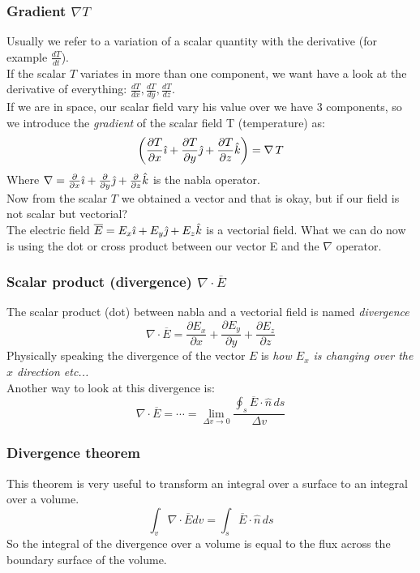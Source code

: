\subsubsection*{Gradient $\nabla T$}
Usually we refer to a variation of a scalar quantity with the derivative (for example $\frac{dT}{dt}$).\\
If the scalar $T$ variates in more than one component, we want have a look at the derivative of everything: $\frac{dT}{dx},\frac{dT}{dy},\frac{dT}{dz}$.\\
If we are in space, our scalar field vary his value over we have 3 components, so we introduce the \emph{gradient} of the scalar field T (temperature) as:
\begin{equation}
\left(\frac{\partial T}{\partial x}\hat{\imath}+\frac{\partial T}{\partial y}\hat{\jmath}+\frac{\partial T}{\partial z}\hat{\mathnormal{k}}\right)=\nabla\,T
\end{equation}
Where $\nabla=\frac{\partial}{\partial x}\hat{\imath} +\frac{\partial}{\partial y}\hat{\jmath} +\frac{\partial}{\partial z}\hat{\mathnormal{k}}$ is the nabla operator.\\
Now from the scalar $T$ we obtained a vector and that is okay, but if our field is not scalar but vectorial?\\
The electric field $\overline{E}=E_x \hat{\imath} + E_y \hat{\jmath} + E_z \hat{\mathnormal{k}}$ is a vectorial field.
What we can do now is using the dot or cross product between our vector E and the $\nabla$ operator.
\subsubsection*{Scalar product (divergence) $\nabla \cdot \overline{E}$}
The scalar product (dot) between nabla and a vectorial field is named \emph{divergence}
\begin{equation}
\nabla \cdot \overline{E} =\frac{\partial E_x}{\partial x}+\frac{\partial E_y}{\partial y}+\frac{\partial E_z}{\partial z}
\end{equation}
Physically speaking the divergence of the vector $E$ is \textit{how $E_x$ is changing over the $x$ direction etc...}\\
Another way to look at this divergence is:
\begin{equation}
\nabla \cdot \overline{E} = \cdots = \lim_{\Delta v \rightarrow 0}\frac{\oint_s \overline{E}\cdot \hat{n}\, ds}{\Delta v}
\end{equation}
\subsubsection*{Divergence theorem}
This theorem is very useful to transform an integral over a surface to an integral over a volume.
\begin{equation}\label{eq:divergence_theorem}
\int_v \nabla \cdot \overline{E} dv= \int_s \overline{E}\cdot \hat{n}\,ds
\end{equation}
So the integral of the divergence over a volume is equal to the flux across the boundary surface of the volume.
